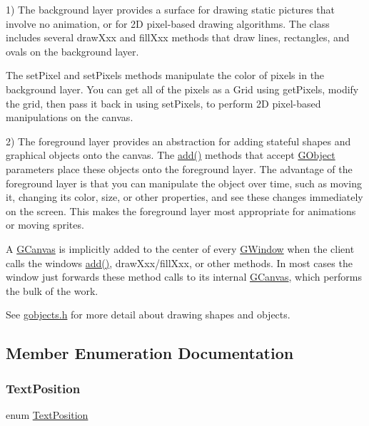 1) The background layer provides a surface for drawing static pictures that involve no animation, or for 2D pixel-\/based drawing algorithms. The class includes several draw\+Xxx and fill\+Xxx methods that draw lines, rectangles, and ovals on the background layer.

The set\+Pixel and set\+Pixels methods manipulate the color of pixels in the background layer. You can get all of the pixels as a Grid using get\+Pixels, modify the grid, then pass it back in using set\+Pixels, to perform 2D pixel-\/based manipulations on the canvas.

2) The foreground layer provides an abstraction for adding stateful shapes and graphical objects onto the canvas. The \mbox{\hyperlink{classGCanvas_afe8277e7b2627513c6f7452fb0b2847d}{add()}} methods that accept \mbox{\hyperlink{classGObject}{G\+Object}} parameters place these objects onto the foreground layer. The advantage of the foreground layer is that you can manipulate the object over time, such as moving it, changing its color, size, or other properties, and see these changes immediately on the screen. This makes the foreground layer most appropriate for animations or moving sprites.

A \mbox{\hyperlink{classGCanvas}{G\+Canvas}} is implicitly added to the center of every \mbox{\hyperlink{classGWindow}{G\+Window}} when the client calls the window\textquotesingle{}s \mbox{\hyperlink{classGCanvas_afe8277e7b2627513c6f7452fb0b2847d}{add()}}, draw\+Xxx/fill\+Xxx, or other methods. In most cases the window just forwards these method calls to its internal \mbox{\hyperlink{classGCanvas}{G\+Canvas}}, which performs the bulk of the work.

See \mbox{\hyperlink{gobjects_8h_source}{gobjects.\+h}} for more detail about drawing shapes and objects. 

\subsection{Member Enumeration Documentation}
\mbox{\label{classGInteractor_a8e0d441725a81d2bbdebbea09078260e}} 
\subsubsection{\texorpdfstring{Text\+Position}{TextPosition}}
{\footnotesize\ttfamily enum \mbox{\hyperlink{classGInteractor_a8e0d441725a81d2bbdebbea09078260e}{Text\+Position}}\hspace{0.3cm}{\ttfamily [inherited]}}



